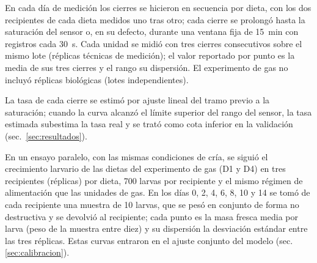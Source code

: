 En cada día de medición los cierres se hicieron en secuencia por dieta, con los dos recipientes de cada dieta medidos uno tras otro; cada cierre se prolongó hasta la saturación del sensor o, en su defecto, durante una ventana fija de 15~min con registros cada 30~s. Cada unidad se midió con tres cierres consecutivos sobre el mismo lote (réplicas técnicas de medición); el valor reportado por punto es la media de sus tres cierres y el rango su dispersión. El experimento de gas no incluyó réplicas biológicas (lotes independientes).

La tasa de cada cierre se estimó por ajuste lineal del tramo previo a la saturación; cuando la curva alcanzó el límite superior del rango del sensor, la tasa estimada subestima la tasa real y se trató como cota inferior en la validación (sec.~\ref{sec:resultados}).

En un ensayo paralelo, con las mismas condiciones de cría, se siguió el crecimiento larvario de las dietas del experimento de gas (D1 y D4) en tres recipientes (réplicas) por dieta, 700 larvas por recipiente y el mismo régimen de alimentación que las unidades de gas. En los días 0, 2, 4, 6, 8, 10 y 14 se tomó de cada recipiente una muestra de 10 larvas, que se pesó en conjunto de forma no destructiva y se devolvió al recipiente; cada punto es la masa fresca media por larva (peso de la muestra entre diez) y su dispersión la desviación estándar entre las tres réplicas. Estas curvas entraron en el ajuste conjunto del modelo (sec.~
\ref{sec:calibracion}).

